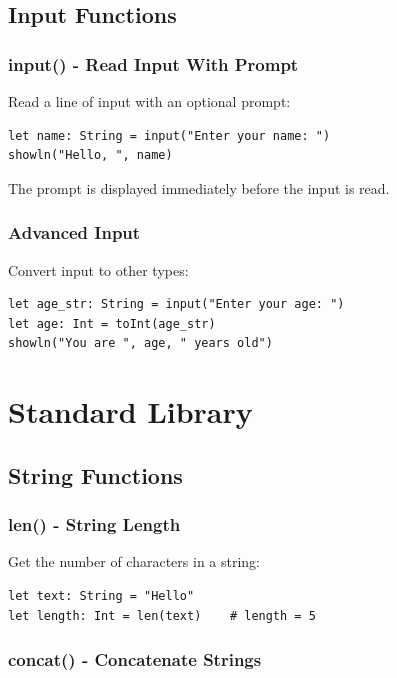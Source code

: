 \documentclass[11pt,twoside,openright]{book}
\begin{document}
\section{Input Functions}

\subsection{input() - Read Input With Prompt}

Read a line of input with an optional prompt:

\begin{lstlisting}[language=ConstructLang]
let name: String = input("Enter your name: ")
showln("Hello, ", name)
\end{lstlisting}

The prompt is displayed immediately before the input is read.

\subsection{Advanced Input}

Convert input to other types:

\begin{lstlisting}[language=ConstructLang]
let age_str: String = input("Enter your age: ")
let age: Int = toInt(age_str)
showln("You are ", age, " years old")
\end{lstlisting}

\chapter{Standard Library}

\section{String Functions}

\subsection{len() - String Length}

Get the number of characters in a string:

\begin{lstlisting}[language=ConstructLang]
let text: String = "Hello"
let length: Int = len(text)    # length = 5
\end{lstlisting}

\subsection{concat() - Concatenate Strings}
\end{document}
